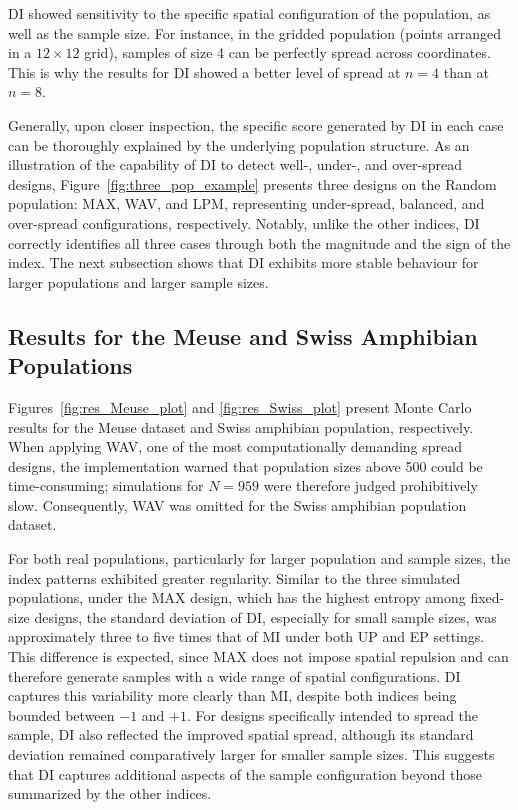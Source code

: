 \documentclass[12pt]{imsart}
\theoremstyle{plain}
\theoremstyle{remark}
\begin{document}
DI showed sensitivity to the specific spatial configuration of the population, as well as the sample size. For instance, in the gridded population (points arranged in a $12\times 12$ grid), samples of size 4 can be perfectly spread across coordinates. This is why the results for DI showed a better level of spread at $n=4$ than at $n=8$.

Generally, upon closer inspection, the specific score generated by DI in each case can be thoroughly explained by the underlying population structure. As an illustration of the capability of DI to detect well-, under-, and over-spread designs, Figure~\ref{fig:three_pop_example} presents three designs on the Random population: MAX, WAV, and LPM, representing under-spread, balanced, and over-spread configurations, respectively. Notably, unlike the other indices, DI correctly identifies all three cases through both the magnitude and the sign of the index. The next subsection shows that DI exhibits more stable behaviour for larger populations and larger sample sizes.

\subsection{Results for the Meuse and Swiss Amphibian Populations}
Figures~\ref{fig:res_Meuse_plot} and \ref{fig:res_Swiss_plot} present Monte Carlo results for the Meuse dataset and Swiss amphibian population, respectively. When applying WAV, one of the most computationally demanding spread designs, the implementation warned that population sizes above 500 could be time-consuming; simulations for $N=959$ were therefore judged prohibitively slow. Consequently, WAV was omitted for the Swiss amphibian population dataset.

For both real populations, particularly for larger population and sample
sizes, the index patterns exhibited greater regularity. Similar to the three
simulated populations, under the MAX design, which has the highest entropy
among fixed-size designs, the standard deviation of DI, especially for small
sample sizes, was approximately three to five times that of MI under both UP
and EP settings. This difference is expected, since MAX does not impose
spatial repulsion and can therefore generate samples with a wide range of
spatial configurations. DI captures this variability more clearly than MI,
despite both indices being bounded between \(-1\) and \(+1\). For designs
specifically intended to spread the sample, DI also reflected the improved
spatial spread, although its standard deviation remained comparatively larger
for smaller sample sizes. This suggests that DI captures additional aspects of
the sample configuration beyond those summarized by the other indices.
\end{document}
